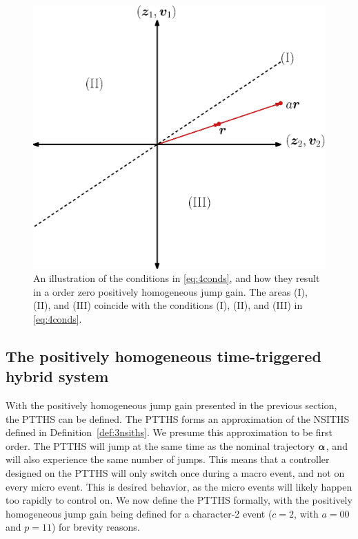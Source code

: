 \documentclass[../DC2017114Bouma.tex]{subfiles}
\begin{document}
\begin{figure}[bt!]
\centering
\includegraphics[width=.5\textwidth]{4cone.eps}\caption{An illustration of the conditions in \eqref{eq:4conds}, and how they result in a order zero positively homogeneous jump gain. The areas \textnormal{(I)}, \textnormal{(II)}, and \textnormal{(III)} coincide with the conditions \textnormal{(I)}, \textnormal{(II)}, and \textnormal{(III)} in \eqref{eq:4conds}.}\label{fig:4cone}
\end{figure}


\subsection{The positively homogeneous time-triggered hybrid system}\label{def:4PTTHS}
With the positively homogeneous jump gain presented in the previous section, the PTTHS can be defined. The PTTHS forms an approximation of the NSITHS defined in Definition~\ref{def:3nsiths}. We presume this approximation to be first order. The PTTHS will jump at the same time as the nominal trajectory $\boldsymbol{\alpha}$, and will also experience the same number of jumps. This means that a controller designed on the PTTHS will only switch once during a macro event, and not on every micro event. This is desired behavior, as the micro events will likely happen too rapidly to control on. We now define the PTTHS formally, with the positively homogeneous jump gain being defined for a character-2 event ($c = 2$, with $a = 00$ and $p=11$) for brevity reasons.
\end{document}
